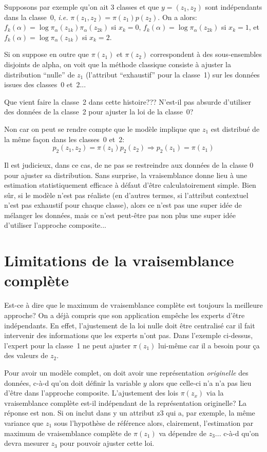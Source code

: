 \documentclass{article}
\begin{document}
Supposons par exemple qu'on ait 3 classes et que $y = (z_1, z_2)$ sont ind\'ependants dans la classe~0, {\em i.e.} $\pi(z_1, z_2) = \pi(z_1)p(z_2)$. On a alors: $f_k(\alpha) = \log \pi_\alpha(z_{1k})\pi_\alpha(z_{2k})$ si $x_k=0$, $f_k(\alpha) = \log \pi_\alpha(z_{2k})$ si $x_k=1$,  et $f_k(\alpha) = \log \pi_\alpha(z_{1k})$ si $x_k=2$.

Si on suppose en outre que $\pi(z_1)$ et $\pi(z_2)$ correspondent \`a des sous-ensembles disjoints de alpha, on voit que la m\'ethode classique consiste \`a ajuster la distribution ``nulle'' de $z_1$ (l'attribut ``exhaustif'' pour la classe~1) sur les donn\'ees issues des classes~0 et~2... 

Que vient faire la classe~2 dans cette histoire??? N'est-il pas absurde d'utiliser des donn\'ees de la classe~2 pour ajuster la loi de la classe~0? 

Non car on peut se rendre compte que le mod\`ele implique que $z_1$ est distribu\'e de la m\^eme fa\c{c}on dans les classes~0 et~2: 
$$
p_2(z_1, z_2) = \pi(z_1) p_2(z_2) 
\Rightarrow 
p_2(z_1) = \pi(z_1)
$$ 

Il est judicieux, dans ce cas, de ne pas se restreindre aux donn\'ees de la classe 0 pour ajuster sa distribution. Sans surprise, la vraisemblance donne lieu \`a une estimation statistiquement efficace \`a d\'efaut d'\^etre calculatoirement simple. Bien s\^ur, si le mod\`ele n'est pas r\'ealiste (en d'autres termes, si l'attribut contextuel n'est pas exhaustif pour chaque classe), alors ce n'est pas une super id\'ee de m\'elanger les donn\'ees, mais ce n'est peut-\^etre pas non plus une super id\'ee d'utiliser l'approche composite... 


\section{Limitations de la vraisemblance compl\`ete}

Est-ce \`a dire que le maximum de vraisemblance compl\`ete est toujours la meilleure approche? On a d\'ej\`a compris que son application emp\^eche les experts d'\^etre ind\'ependants. En effet, l'ajustement de la loi nulle doit \^etre centralis\'e car il fait intervenir des informations que les experts n'ont pas. Dans l'exemple ci-dessus, l'expert pour la classe~1 ne peut ajuster $\pi(z_1)$ lui-m\^eme car il a besoin pour \c{c}a des valeurs de $z_2$. 

Pour avoir un mod\`ele complet, on doit avoir une repr\'esentation {\em originelle} des donn\'ees, c-\`a-d qu'on doit d\'efinir la variable $y$ alors que celle-ci n'a n'a pas lieu d'\^etre dans l'approche composite. L'ajustement des lois $\pi(z_x)$ via la vraisemblance compl\`ete est-il ind\'ependant de la repr\'esentation originelle? La r\'eponse est non. Si on inclut dans y un attribut z3 qui a, par exemple, la m\^eme variance que $z_1$ sous l'hypoth\`ese de r\'ef\'erence alors, clairement, l'estimation par maximum de vraisemblance compl\`ete de $\pi(z_1)$ va d\'ependre de $z_3$... c-\`a-d qu'on devra mesurer $z_3$ pour pouvoir ajuster cette loi. 
\end{document}
